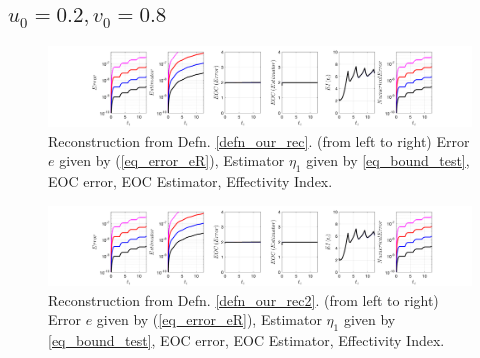 \documentclass[12pt,a4paper]{article}
\numberwithin{equation}{section}
\theoremstyle{definition}
\begin{document}
\subsection*{$u_0=0.2, v_0= 0.8$}
\begin{figure}[H]
	\hspace{-3cm}
	\includegraphics[scale=0.55]{fig_LeapFrogplots_1x5_sin_IC_harmonic_order_2_u2_v8_rec_george}	
	\caption{Reconstruction from Defn. \ref{defn_our_rec}. (from left to right) Error $e$ given by (\ref{eq_error_eR}), Estimator $\eta_1$ given by \ref{eq_bound_test},  EOC error, EOC Estimator, Effectivity Index.}
	\label{fig_all_in_one_our_rec_george_u2_v8}
\end{figure}
\begin{figure}[H]
	\hspace{-3cm}
	\includegraphics[scale=0.55]{fig_LeapFrogplots_1x5_sin_IC_harmonic_order_2_u2_v8_rec2}	
	\caption{Reconstruction from Defn. \ref{defn_our_rec2}. (from left to right) Error $e$ given by (\ref{eq_error_eR}), Estimator $\eta_1$ given by \ref{eq_bound_test},   EOC error, EOC Estimator, Effectivity Index.}
	\label{fig_all_in_one_our_rec_2_u2_v8}
\end{figure}
\end{document}
